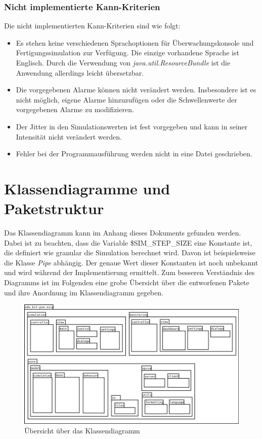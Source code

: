 \documentclass[parskip=full]{scrartcl}
\begin{document}
\subsubsection{Nicht implementierte Kann-Kriterien}
Die nicht implementierten Kann-Kriterien sind wie folgt:

\begin{itemize}
    \item Es stehen keine verschiedenen Sprachoptionen f\"ur \"Uberwachungskonsole und Fertigungssimulation zur Verf\"ugung.
    Die einzige vorhandene Sprache ist Englisch. Durch die Verwendung von \emph{java.util.ResourceBundle} ist die Anwendung allerdings leicht übersetzbar.
    \item Die vorgegebenen Alarme k\"onnen nicht ver\"andert werden. Insbesondere ist es nicht m\"oglich, eigene Alarme hinzuzuf\"ugen
    oder die Schwellenwerte der vorgegebenen Alarme zu modifizieren.
    \item Der Jitter in den Simulationswerten ist fest vorgegeben und kann in seiner Intensit\"at nicht ver\"andert werden.
    \item Fehler bei der Programmausf\"uhrung werden nicht in eine Datei geschrieben.
\end{itemize}

\section{Klassendiagramme und Paketstruktur}
Das Klassendiagramm kann im Anhang dieses Dokuments gefunden werden. Dabei ist zu beachten, dass die Variable \$SIM\_STEP\_SIZE eine Konstante ist,
die definiert wie granular die Simulation berechnet wird. Davon ist beispielsweise die Klasse \emph{Pipe} abhängig. Der genaue Wert dieser
Konstanten ist noch unbekannt und wird während der Implementierung ermittelt. Zum besseren Verständnis des Diagramms ist im Folgenden
eine grobe Übersicht über die entworfenen Pakete und ihre Anordnung im Klassendiagramm gegeben.

\begin{figure}[H]
  \centering
  \includegraphics[scale=0.45]{design/class-diagram-map.png}
  \caption{Übersicht über das Klassendiagramm}
\end{figure}
\end{document}
